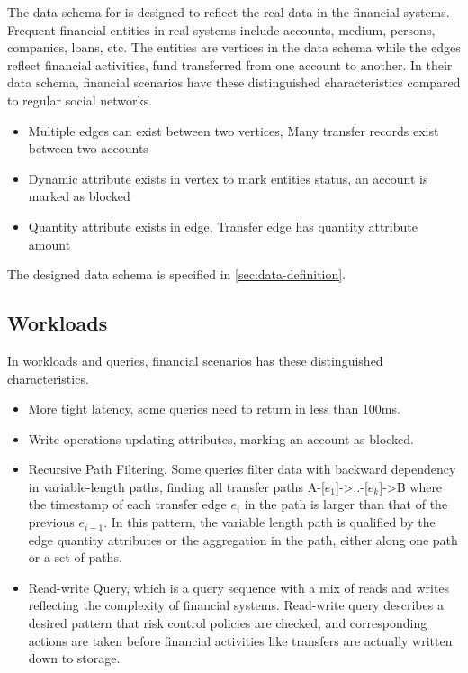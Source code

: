 The data schema for \ldbcfinbench is designed to reflect the real data in the financial systems. Frequent
financial entities in real systems include accounts, medium, persons, companies, loans, etc. The
entities are vertices in the data schema while the edges reflect financial activities, \eg fund transferred
from one account to another. In their data schema, financial scenarios have these distinguished characteristics
compared to regular social networks.
\begin{itemize}
      \item Multiple edges can exist between two vertices, \eg Many transfer records exist between two accounts
      \item Dynamic attribute exists in vertex to mark entities status, \eg an account is marked as blocked
      \item Quantity attribute exists in edge, \eg Transfer edge has quantity attribute amount
\end{itemize}

The designed data schema is specified in \autoref{sec:data-definition}.

\subsection{Workloads}

In workloads and queries, financial scenarios has these distinguished characteristics.
\begin{itemize}
      \item More tight latency, \eg some queries need to return in less than 100ms.
      \item Write operations updating attributes, \eg marking an account as blocked.
      \item Recursive Path Filtering. Some queries filter data with backward dependency
            in variable-length paths, \eg finding all transfer paths A-[${e_1}$]->..-[${e_k}$]->B
            where the timestamp of each transfer edge ${e_i}$ in the path is larger than that of
            the previous ${e_{i-1}}$. In this pattern, the variable length path is qualified by
            the edge quantity attributes or the aggregation in the path, either along one path
            or a set of paths.
      \item Read-write Query, which is a query sequence with a mix of reads and writes reflecting the
            complexity of financial systems. Read-write query describes a desired pattern that risk control
            policies are checked, and corresponding actions are taken before financial activities like
            transfers are actually written down to storage.
\end{itemize}

